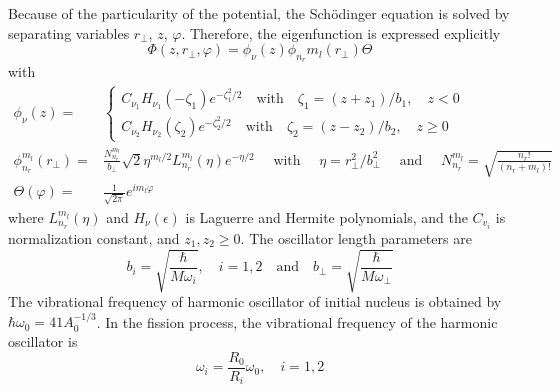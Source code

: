   Because of the particularity of the potential, the Sch{\"o}dinger equation is solved by separating variables $r_\perp$, $z$, $\varphi$. Therefore, the eigenfunction is expressed explicitly
  \begin{equation}
    \Phi(z, r_\perp, \varphi) = \phi_\nu(z)\phi_{n_r}{m_l}(r_\perp)\Theta \label{tc_sep_var} 
  \end{equation}
  with
  \begin{align}
    \phi_{\nu}(z)=&\left\{
      \begin{array}{l}
        C_{\nu_{1}} H_{\nu_{1}}\left(-\zeta_{1}\right) e^{-\zeta_{1}^{2} / 2} \quad \text{with} \quad \zeta_{1}=\left(z+z_{1}\right) / b_{1}, \quad z<0 \\
        C_{\nu_{2}} H_{\nu_{2}}\left(\zeta_{2}\right) e^{-\zeta_{2}^{2} / 2} \quad \text{with} \quad \zeta_{2}=\left(z-z_{2}\right) / b_{2}, \quad z \geq 0
    \end{array}\right.  \\
    \phi_{n_{r}}^{m_{l}}\left(r_{\perp}\right)=&\frac{N_{n_{r}}^{m_{l}}}{b_{\perp}} \sqrt{2} \eta^{m_{l} / 2} L_{n_{r}}^{m_{l}}(\eta) e^{-\eta / 2} \quad \text { with } \quad \eta=r_{\perp}^{2} / b_{\perp}^{2} \quad \text { and } \quad N_{n_{r}}^{m_{l}}=\sqrt{\frac{n_{r} !}{\left(n_{r}+m_{l}\right) !}}\\
    \Theta(\varphi)=&\frac{1}{\sqrt{2 \pi}} e^{i m_{l} \varphi}
  \end{align}
  where $L_{n_r}^{m_l}(\eta)$ and $H_\nu(\epsilon)$ is Laguerre and Hermite polynomials, and the $C_{v_i}$ is normalization constant, and $z_1, z_2 \geqslant 0$. The oscillator length parameters are
  \begin{equation}
    b_i = \sqrt{\frac{\hbar}{M\omega_i}},\quad i = 1,2 \quad \text{and} \quad
    b_\perp = \sqrt{\frac{\hbar}{M\omega_\perp}}
  \end{equation}
  The vibrational frequency of harmonic oscillator of initial nucleus is obtained by $\hbar\omega_0 = 41 A_0^{-1/3}$. In the fission process, the vibrational frequency of the harmonic oscillator is
  \begin{equation}
    \omega_i = \frac{R_0}{R_i}\omega_0, \quad i = 1, 2
  \end{equation}

